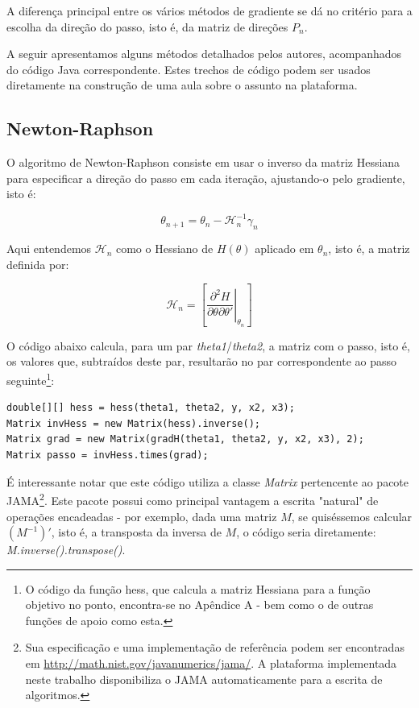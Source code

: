 \documentclass{abnt}
\newenvironment{mylisting}
{\begin{list}{}{\setlength{\leftmargin}{1em}}\item\scriptsize\bfseries}
{\end{list}}
\begin{document}
A diferença principal entre os vários métodos de gradiente se dá no critério para a escolha da direção do passo, isto é, da matriz de direções $P_n$.

A seguir apresentamos alguns métodos detalhados pelos autores, acompanhados do código Java correspondente. Estes trechos de código podem ser usados diretamente na construção de uma aula sobre o assunto na plataforma.

\subsection{Newton-Raphson}

	O algoritmo de Newton-Raphson consiste em usar o inverso da matriz Hessiana para especificar a direção do passo em cada iteração, ajustando-o pelo gradiente, isto é:

\[ \theta_{n+1} = \theta_{n} - \mathcal{H}_{n}^{-1}\gamma_{n} \]

Aqui entendemos $\mathcal{H}_n$ como o Hessiano de $H(\theta)$ aplicado em $\theta_n$, isto é, a matriz definida por:

	\[  \mathcal{H}_n = \left [ \left . \frac{\partial^2 H}{\partial \theta \partial \theta'} \right |_{\theta_n}  \right ] \]


O código abaixo calcula, para um par \textit{theta1}/\textit{theta2}, a matriz com o passo, isto é, os valores que, subtraídos deste par, resultarão no par correspondente ao passo seguinte\footnote{O código da função hess, que calcula a matriz Hessiana para a função objetivo no ponto, encontra-se no Apêndice A - bem como o de outras funções de apoio como esta.}:

\begin{mylisting}
\begin{verbatim}
double[][] hess = hess(theta1, theta2, y, x2, x3);
Matrix invHess = new Matrix(hess).inverse();
Matrix grad = new Matrix(gradH(theta1, theta2, y, x2, x3), 2);
Matrix passo = invHess.times(grad);
\end{verbatim}
\end{mylisting}

É interessante notar que este código utiliza a classe \textit{Matrix} pertencente  ao pacote JAMA\footnote{Sua especificação e uma implementação de referência podem ser encontradas em \url{http://math.nist.gov/javanumerics/jama/}. A plataforma implementada neste trabalho disponibiliza o JAMA automaticamente para a escrita de algoritmos.}. Este pacote possui como principal vantagem a escrita "natural" de operações encadeadas - por exemplo, dada uma matriz $M$, se quiséssemos calcular $(M^{-1})'$, isto é, a transposta da inversa de $M$, o código seria diretamente: \textit{M.inverse().transpose()}.
\end{document}
